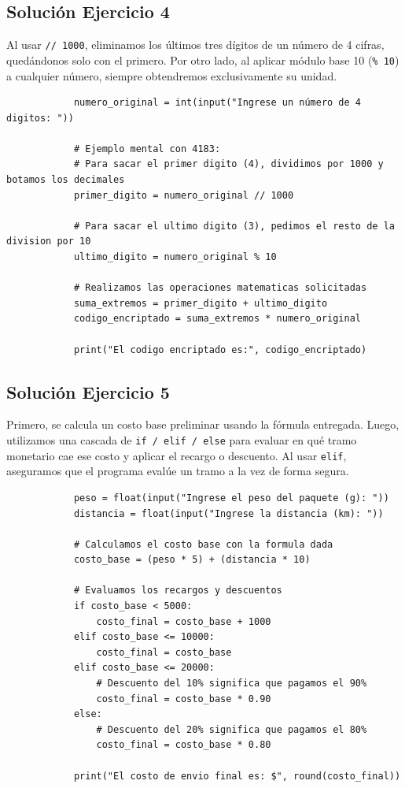 \documentclass[11pt, a4paper]{article}
\begin{document}
	\subsection*{Solución Ejercicio 4}
	\begin{solucion}
		Al usar \texttt{// 1000}, eliminamos los últimos tres dígitos de un número de 4 cifras, quedándonos solo con el primero. Por otro lado, al aplicar módulo base 10 (\texttt{\% 10}) a cualquier número, siempre obtendremos exclusivamente su unidad.
		
		\begin{lstlisting}
			numero_original = int(input("Ingrese un número de 4 digitos: "))
			
			# Ejemplo mental con 4183:
			# Para sacar el primer digito (4), dividimos por 1000 y botamos los decimales
			primer_digito = numero_original // 1000
			
			# Para sacar el ultimo digito (3), pedimos el resto de la division por 10
			ultimo_digito = numero_original % 10
			
			# Realizamos las operaciones matematicas solicitadas
			suma_extremos = primer_digito + ultimo_digito
			codigo_encriptado = suma_extremos * numero_original
			
			print("El codigo encriptado es:", codigo_encriptado)
		\end{lstlisting}
	\end{solucion}
	
	\subsection*{Solución Ejercicio 5}
	\begin{solucion}
		Primero, se calcula un costo base preliminar usando la fórmula entregada. Luego, utilizamos una cascada de \texttt{if / elif / else} para evaluar en qué tramo monetario cae ese costo y aplicar el recargo o descuento. Al usar \texttt{elif}, aseguramos que el programa evalúe un tramo a la vez de forma segura.
		
		\begin{lstlisting}
			peso = float(input("Ingrese el peso del paquete (g): "))
			distancia = float(input("Ingrese la distancia (km): "))
			
			# Calculamos el costo base con la formula dada
			costo_base = (peso * 5) + (distancia * 10)
			
			# Evaluamos los recargos y descuentos
			if costo_base < 5000:
				costo_final = costo_base + 1000
			elif costo_base <= 10000:
				costo_final = costo_base
			elif costo_base <= 20000:
				# Descuento del 10% significa que pagamos el 90%
				costo_final = costo_base * 0.90
			else:
				# Descuento del 20% significa que pagamos el 80%
				costo_final = costo_base * 0.80
			
			print("El costo de envio final es: $", round(costo_final))
		\end{lstlisting}
	\end{solucion}
	
\end{document}
